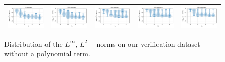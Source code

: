 \documentclass[12pt]{report} %
\begin{document}
\begin{figure}
\begin{tabular}{ccccc}
     {\includegraphics[width=.014\textwidth,clip=true,trim={0 0 9cm 0}]{imagenes/experiments/1d/ode/violins_l2_u_xx-2_C7_gaussian_kernel_shape_0.78125_Poly-1.pdf}} & \includegraphics[width=.2\textwidth,clip=true,trim={.81cm 0 0 0}]{imagenes/experiments/1d/ode/violins_l2_u_xx-2_C30_gaussian_kernel_shape_5.16_Poly-1.pdf}  & \includegraphics[width=.2\textwidth,clip=true,trim={.81cm 0 0 0}]{imagenes/experiments/1d/ode/violins_l2_u_xx-2_C40_gaussian_kernel_shape_7.03_Poly-1.pdf}  & \includegraphics[width=.2\textwidth,clip=true,trim={.81cm 0 0 0}]{imagenes/experiments/1d/ode/violins_l2_u_xx-2_C50_gaussian_kernel_shape_8.89_Poly-1.pdf} & \includegraphics[width=.2\textwidth,clip=true,trim={.81cm 0 0 0}]{imagenes/experiments/1d/ode/violins_l2_u_xx-2_C60_gaussian_kernel_shape_10.74_Poly-1.pdf}   \\
  \end{tabular}
  \caption{Distribution of the $L^\infty$, $L^2-$norms on our verification dataset
    without a polynomial term.}
  \label{fig:ode-results-overall-poly-1}
\end{figure}
\end{document}
